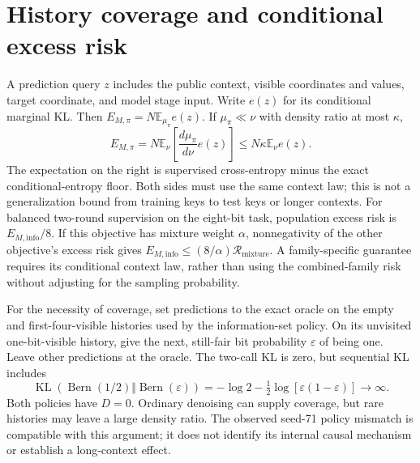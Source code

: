 \documentclass{article}
\newcommand{\KL}{\operatorname{KL}}
\begin{document}
\section{History coverage and conditional excess risk}
\label{app:coverage}
A prediction query $z$ includes the public context, visible coordinates and
values, target coordinate, and model stage input. Write $e(z)$ for its
conditional marginal KL. Then $E_{M,\pi}=N\mathbb E_{\mu_\pi}e(z)$.
If $\mu_\pi\ll\nu$ with density ratio at most $\kappa$,
\[
 E_{M,\pi}=N\mathbb E_\nu\!\left[\frac{d\mu_\pi}{d\nu}e(z)\right]
 \le N\kappa\mathbb E_\nu e(z).
\]
The expectation on the right is supervised cross-entropy minus the exact
conditional-entropy floor. Both sides must use the same context law; this is
not a generalization bound from training keys to test keys or longer contexts.
For balanced two-round supervision on the eight-bit task, population excess
risk is $E_{M,\mathrm{info}}/8$. If this objective has mixture weight $\alpha$,
nonnegativity of the other objective's excess risk gives
$E_{M,\mathrm{info}}\le(8/\alpha)\mathcal R_{\mathrm{mixture}}$.
A family-specific guarantee requires its conditional context law, rather than
using the combined-family risk without adjusting for the sampling probability.

For the necessity of coverage, set predictions to the exact oracle on the
empty and first-four-visible histories used by the information-set policy.
On its unvisited one-bit-visible history, give the next, still-fair bit
probability $\varepsilon$ of being one. Leave other predictions at the oracle.
The two-call KL is zero, but sequential KL includes
\[
 \KL(\operatorname{Bern}(1/2)\Vert\operatorname{Bern}(\varepsilon))
 =-\log2-\tfrac12\log[\varepsilon(1-\varepsilon)]\longrightarrow\infty.
\]
Both policies have $D=0$. Ordinary denoising can supply coverage, but rare
histories may leave a large density ratio. The observed seed-71 policy mismatch
is compatible with this argument; it does not identify its internal causal
mechanism or establish a long-context effect.
\end{document}
